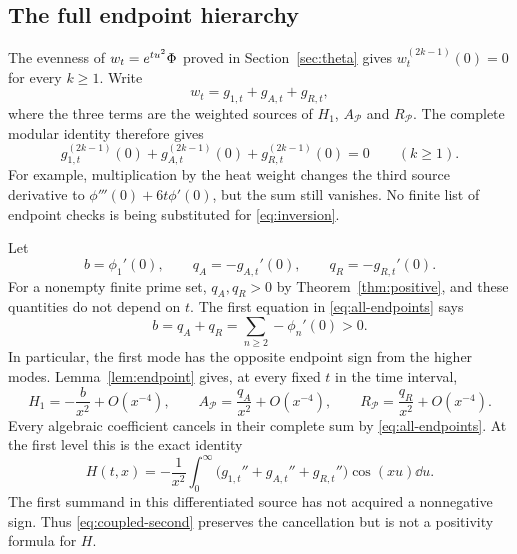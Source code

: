 \subsection{The full endpoint hierarchy}

The evenness of $w_t=e^{tu^2}\Phi$ proved in Section~\ref{sec:theta} gives
$w_t^{(2k-1)}(0)=0$ for every $k\ge1$. Write
\[
 w_t=g_{1,t}+g_{A,t}+g_{R,t},
\]
where the three terms are the weighted sources of $H_1$, $A_{\mathcal P}$
and $R_{\mathcal P}$. The complete modular identity therefore gives
\begin{equation}\label{eq:all-endpoints}
 g_{1,t}^{(2k-1)}(0)+g_{A,t}^{(2k-1)}(0)
                         +g_{R,t}^{(2k-1)}(0)=0
 \qquad(k\ge1).
\end{equation}
For example, multiplication by the heat weight changes the third source
derivative to $\phi'''(0)+6t\phi'(0)$, but the sum still vanishes.
No finite list of endpoint checks is being substituted for
\eqref{eq:inversion}.

Let
\begin{equation}\label{eq:exact-masses}
 b=\phi_1'(0),\qquad q_A=-g_{A,t}'(0),\qquad
 q_R=-g_{R,t}'(0).
\end{equation}
For a nonempty finite prime set, $q_A,q_R>0$ by
Theorem~\ref{thm:positive}, and these quantities do not depend on $t$.
The first equation in \eqref{eq:all-endpoints} says
\begin{equation}\label{eq:mass-cancellation}
 b=q_A+q_R=\sum_{n\ge2}-\phi_n'(0)>0.
\end{equation}
In particular, the first mode has the opposite endpoint sign from the
higher modes. Lemma~\ref{lem:endpoint} gives, at every fixed $t$ in the
time interval,
\begin{equation}\label{eq:three-tails}
 H_1=-\frac b{x^2}+O(x^{-4}),\qquad
 A_{\mathcal P}=\frac{q_A}{x^2}+O(x^{-4}),\qquad
 R_{\mathcal P}=\frac{q_R}{x^2}+O(x^{-4}).
\end{equation}
Every algebraic coefficient cancels in their complete sum by
\eqref{eq:all-endpoints}. At the first level this is the exact identity
\begin{equation}\label{eq:coupled-second}
 H(t,x)=-\frac1{x^2}\int_0^\infty
   \bigl(g_{1,t}''+g_{A,t}''+g_{R,t}''\bigr)\cos(xu)\dd u.
\end{equation}
The first summand in this differentiated source has not acquired a
nonnegative sign. Thus \eqref{eq:coupled-second} preserves the cancellation
but is not a positivity formula for $H$.

